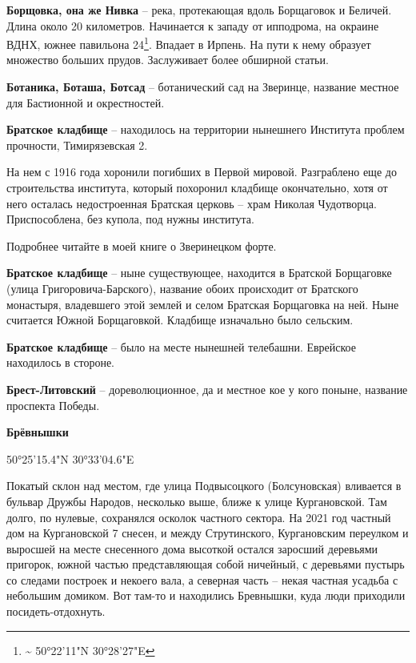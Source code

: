 \medskip

\textbf{Борщовка, она же Нивка} – река, протекающая вдоль Борщаговок и Беличей. Длина около 20 километров. Начинается к западу от ипподрома, на окраине ВДНХ, южнее павильона 24\footnote{\textasciitilde{} 50°22'11"N 30°28'27"E}. Впадает в Ирпень. На пути к нему образует множество больших прудов. Заслуживает более обширной статьи.\\

\medskip

\textbf{Ботаника, Боташа, Ботсад} – ботанический сад на Зверинце, название местное для Бастионной и окрестностей.\\

\medskip


\textbf{Братское кладбище} – находилось на территории нынешнего Института проблем прочности, Тимирязевская 2. 

На нем с 1916 года хоронили погибших в Первой мировой. Разграблено еще до строительства института, который похоронил кладбище окончательно, хотя от него осталась недостроенная Братская церковь – храм Николая Чудотворца. Приспособлена, без купола, под нужны института.

Подробнее читайте в моей книге о Зверинецком форте.\\

\medskip

\textbf{Братское кладбище} – ныне существующее, находится в Братской Борщаговке (улица Григо\-ровича-Барского), название обоих происходит от Братского монастыря, владевшего этой землей и селом Братская Борщаговка на ней. Ныне считается Южной Борщаговкой. Кладбище изначально было сельским.\\

\medskip

\textbf{Братское кладбище} – было на месте нынешней телебашни. Еврейское находилось в стороне.\\

\medskip

\textbf{Брест-Литовский} – дореволюционное, да и местное кое у кого поныне, название проспекта Победы.\\

\medskip

\textbf{Брёвнышки}

50°25'15.4"N 30°33'04.6"E

Покатый склон над местом, где улица Подвысоцкого (Болсуновская) вливается в бульвар Дружбы Народов, несколько выше, ближе к улице Кургановской. Там долго, по нулевые, сохранялся осколок частного сектора. На 2021 год частный дом на Кургановской 7 снесен, и между Струтинского, Кургановским переулком и выросшей на месте снесенного дома высоткой остался заросший деревьями пригорок, южной частью представляющая собой ничейный, с деревьями пустырь со следами построек и некоего вала, а северная часть – некая частная усадьба с небольшим домиком. Вот там-то и находились Бревнышки, куда люди приходили посидеть-отдохнуть.

